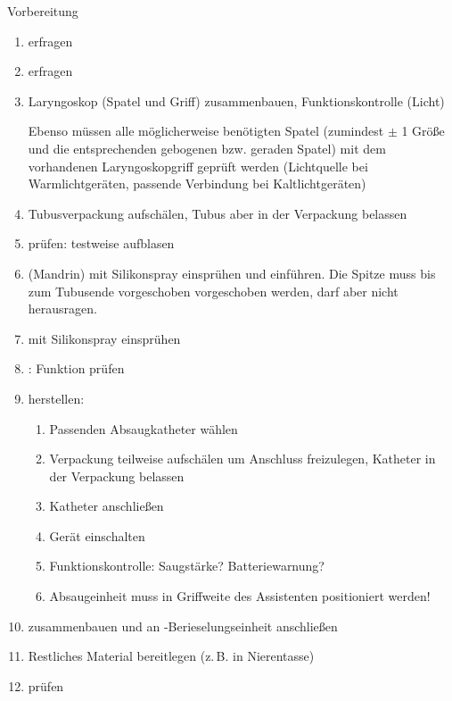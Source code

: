 \begin{ProcedureStepsWide}{Vorbereitung}
\begin{enumerate}
  \item {} erfragen
  \item {} erfragen
  \item {} Laryngoskop (Spatel und
  Griff) zusammenbauen, Funktionskontrolle (Licht)
  
  Ebenso müssen alle möglicherweise benötigten Spatel
  (zumindest $\pm$ 1 Größe und die entsprechenden
  gebogenen bzw. geraden Spatel) mit dem
  vorhandenen Laryngoskopgriff geprüft werden (Lichtquelle
  bei Warmlichtgeräten, passende Verbindung bei Kaltlichtgeräten)
  \item Tubusverpackung aufschälen, Tubus aber in der Verpackung belassen
  \item {} prüfen: test\-weise aufblasen
  \item {} (Mandrin) mit Silikonspray
  einsprühen und
  einführen. Die Spitze muss bis zum Tubusende vorgeschoben vorgeschoben
  werden, darf aber nicht herausragen.
  \item {} mit Silikonspray einsprühen
  \item {}: Funktion prüfen
  \item {} herstellen:
  \begin{enumerate}
    \item Passenden Absaugkatheter wählen
    \item Verpackung teilweise aufschälen um Anschluss
    freizulegen, Katheter in der Verpackung belassen
    \item Katheter anschließen
    \item Gerät einschalten
    \item Funktionskontrolle: Saugstärke?
    Batteriewarnung?
    \item Absaugeinheit muss in Griff\-weite des Assistenten
    positioniert werden!
  \end{enumerate}
  \item {} zusammenbauen und an
  -Berieselungseinheit anschließen
  \item Restliches Material bereitlegen (z.\,B. in Nierentasse)
  \item {} prüfen

\end{enumerate}
\end{ProcedureStepsWide}
